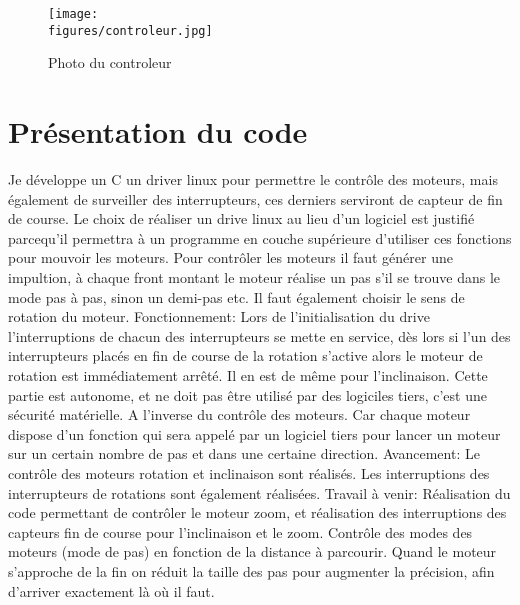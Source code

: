 \begin{figure}[H]
    \centering
	\texttt{[image: \\figures/controleur.jpg]}
    \decoRule
    \caption[
    Photo du controleur]{
    Photo du controleur}
    \label{fig:Photo du controleur}
    \end{figure}


\section{Présentation du code}

Je développe un C un driver linux pour permettre le contrôle des moteurs, mais également de surveiller des interrupteurs, ces derniers serviront de capteur de fin de course. \newline
Le choix de réaliser un drive linux au lieu d'un logiciel est justifié parcequ'il permettra à un programme en couche supérieure d'utiliser ces fonctions pour mouvoir les moteurs.\newline
Pour contrôler les moteurs il faut générer une impultion, à chaque front montant le moteur réalise un pas s'il se trouve dans le mode pas à pas, sinon un demi-pas etc. Il faut également choisir le sens de rotation du moteur. \newline \newline
Fonctionnement: \newline
Lors de l'initialisation du drive l'interruptions de chacun des interrupteurs se mette en service, dès lors si l'un des interrupteurs placés en fin de course de la rotation s'active alors le moteur de rotation est immédiatement arrêté. Il en est de même pour l'inclinaison. Cette partie est autonome, et ne doit pas être utilisé par des logiciles tiers, c'est une sécurité matérielle. A l'inverse du contrôle des moteurs. Car chaque moteur dispose d'un fonction qui sera appelé par un logiciel tiers pour lancer un moteur sur un certain nombre de pas et dans une certaine direction.
\newline \newline
Avancement:\newline
Le contrôle des moteurs rotation et inclinaison sont réalisés. Les interruptions des interrupteurs de rotations sont également réalisées.
\newline \newline
Travail à venir:\newline
Réalisation du code permettant de contrôler le moteur zoom, et réalisation des interruptions des capteurs fin de course pour l'inclinaison et le zoom. \newline
Contrôle des modes des moteurs (mode de pas) en fonction de la distance à parcourir. Quand le moteur s'approche de la fin on réduit la taille des pas pour augmenter la précision, afin d'arriver exactement là où il faut.\newline

